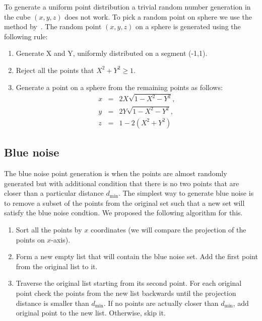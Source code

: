 To generate a uniform point distribution a trivial random number
generation in the cube $(x,y,z)$ does not work. To pick a random point
on sphere we use the method by~\cite{bib:marsaglia1972}. The random
point $(x,y,z)$ on a sphere is generated using the following rule:
\begin{enumerate}
\item Generate X and Y, uniformly distributed on a segment (-1,1).
\item Reject all the points that $X^2+Y^2\ge 1$.
\item Generate a point on a sphere from the remaining points as
  follows:
\begin{equation}
  \begin{aligned}
    x &=& 2X\sqrt{1 - X^2 - Y^2},\\
    y &=& 2Y\sqrt{1 - X^2 - Y^2},\\
    z &=& 1 - 2(X^2+Y^2)
  \end{aligned}
\end{equation}
\end{enumerate}

\subsection{Blue noise}\label{sec:bluenoise}

The blue noise point generation is when the points are almost randomly
generated but with additional condition that there is no two points
that are closer than a particular distance $d_{\min}$. The simplest
way to generate blue noise is to remove a subset of the points from
the original set such that a new set will satisfy the blue noise
condtion. We proposed the following algorithm for this.

\begin{enumerate}
\item
  Sort all the points by $x$ coordinates (we will compare the
  projection of the points on $x$-axis).
\item
  Form a new empty list that will contain the blue noise set. Add the
  first point from the original list to it.
\item
  Traverse the original list starting from its second point. For each
  original point check the points from the new list backwards until
  the projection distance is smaller than $d_{\min}$. If no points are
  actually closer than $d_{\min}$, add original point to the new
  list. Otherwise, skip it.
\end{enumerate}


